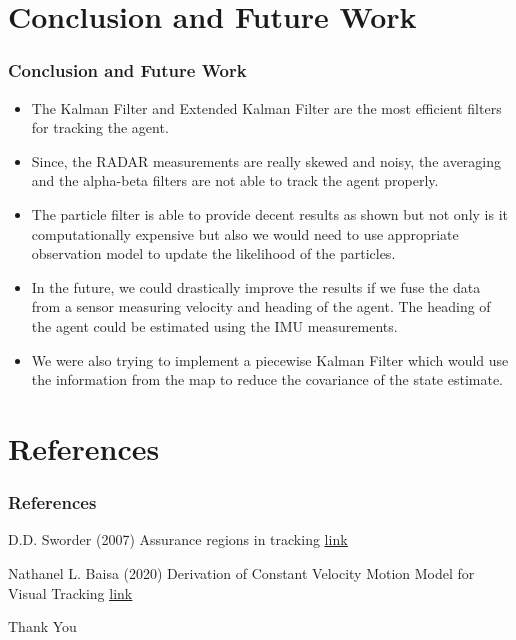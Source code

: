 \documentclass{beamer}
\begin{document}
\section{Conclusion and Future Work}
\begin{frame}
\frametitle{Conclusion and Future Work}
\begin{itemize}
    \item The Kalman Filter and Extended Kalman Filter are the most efficient filters for tracking the agent.
    \item Since, the RADAR measurements are really skewed and noisy, the averaging and the alpha-beta filters are not able to track the agent properly.
    \item The particle filter is able to provide decent results as shown but not only is it computationally expensive but also we would need to use appropriate observation
    model to update the likelihood of the particles.
    \item In the future, we could drastically improve the results if we fuse the data from a sensor measuring velocity and heading of the agent. The heading of the agent could be estimated using the 
    IMU measurements.
    \item We were also trying to implement a piecewise Kalman Filter which would use the information from the map to reduce the covariance of the state estimate.
\end{itemize}
\end{frame}



\section{References}


\begin{frame}
\frametitle{References}
\footnotesize{
\begin{thebibliography}{99} %
 D.D. Sworder (2007)
\newblock Assurance regions in tracking
\newblock \href{https://drive.google.com/file/d/1W1eB29tVJYWAzfcWRojw3QTsvRBPBr-w/view?usp=sharing}{\underline{link}}
\end{thebibliography}
\begin{thebibliography}{99} %
     Nathanel L. Baisa (2020)
    \newblock Derivation of Constant Velocity Motion Model for Visual Tracking
    \newblock \href{https://arxiv.org/pdf/2005.00844.pdf}{\underline{link}}
    \end{thebibliography}
}

\end{frame}


\begin{frame}
\Huge{\centerline{Thank You}}
\end{frame}

\end{document}
